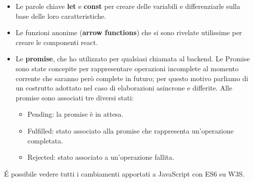 \begin{itemize}
    \item Le parole chiave \textbf{let} e \textbf{const} per creare delle variabili e differenziarle sulla base delle loro caratteristiche.
    \item Le funzioni anonime (\textbf{arrow functions}) che si sono rivelate utilissime per creare le componenti react.
    \item Le \textbf{promise}, che ho utilizzato per qualsiasi chiamata al backend. Le Promise sono state concepite per rappresentare operazioni incomplete al momento corrente che saranno però complete in futuro; per questo motivo parliamo di un costrutto adottato nel caso di elaborazioni asincrone e differite. Alle promise sono associati tre diversi stati:
    \begin{itemize}
        \item Pending: la promise è in attesa.
        \item Fulfilled: stato associato alla promise che rappresenta un'operazione completata.
        \item Rejected: stato associato a un'operazione fallita.\cite{PromiseDefinition}
    \end{itemize}
\end{itemize}
\'E possibile vedere tutti i cambiamenti apportati a JavaScript con ES6 su W3S\cite{ECMAScript6}.

